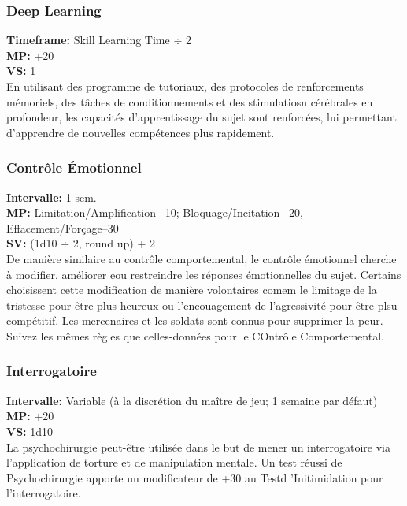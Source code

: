 \subsubsection{Deep Learning}
\textbf{Timeframe:} Skill Learning Time $\div$ 2
\\ \textbf{MP:} +20 \\
\textbf{VS:} 1 \\ En utilisant des programme de tutoriaux, des protocoles de renforcements mémoriels, des tâches de conditionnements et des stimulatiosn cérébrales en profondeur, les capacités d'apprentissage du sujet sont renforcées, lui permettant d'apprendre de nouvelles compétences plus rapidement. 

\subsubsection{Contrôle Émotionnel} \textbf{Intervalle:} 1 sem. \\ \textbf{MP:} Limitation/Amplification –10; Bloquage/Incitation –20, Effacement/Forçage–30 \\ \textbf{SV:} (1d10 $\div$ 2, round up) + 2 \\ De manière similaire au contrôle comportemental, le contrôle émotionnel cherche à modifier, améliorer eou restreindre les réponses émotionnelles du sujet. Certains choisissent cette modification de manière volontaires comem le limitage de la tristesse pour être plus heureux ou l'encouagement de l'agressivité pour être plsu compétitif. Les mercenaires et les soldats sont connus pour supprimer la peur. Suivez les mêmes règles que celles-données pour le COntrôle Comportemental. 

\subsubsection{Interrogatoire} \textbf{Intervalle:} Variable (à la discrétion du maître de jeu; 1 semaine par défaut) \\ \textbf{MP:} +20 \\ \textbf{VS:} 1d10 \\ La psychochirurgie peut-être utilisée dans le but de mener un interrogatoire via l'application de torture et de manipulation mentale. Un test réussi de Psychochirurgie apporte un modificateur de +30 au Testd 'Initimidation pour l'interrogatoire. 

